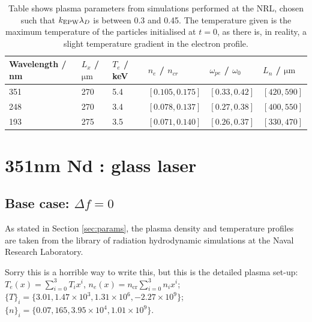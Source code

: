 \begin{table}[h]
\begin{center}

\begin{tabular}{|l|l|l|l|l|l|}
\hline
Wavelength / nm & $L_x$ /$\si{\micro\metre}$ & $T_e$ / keV & $n_e$ / $n_{cr}$ & $\omega_{pe}$ / $\omega_0$ & $L_n$ / $\si{\micro\metre}$
\\ \hline 
351 & 270 & 5.4 & $[0.105,0.175]$ & $[0.33,0.42]$ & $[420,590]$ \\ \hline
248 & 270 & 3.4 & $[0.078,0.137]$ & $[0.27,0.38]$ & $[400,550]$ \\ \hline
193 & 275 & 3.5 & $[0.071,0.140]$ & $[0.26,0.37]$ & $[330,470]$ \\ \hline

\end{tabular}

\end{center}
\caption{Table shows plasma parameters from simulations performed at the NRL, chosen such that $k_\mathrm{EPW}\lambda_D$ is between 0.3 and 0.45. The temperature given is the maximum temperature of the particles initialised at $t=0$, as there is, in reality, a slight temperature gradient in the electron profile.}
\label{tab:plasma}
\end{table}




\section{351nm Nd : glass laser}\label{sec:351}

\subsection{Base case: $\Delta f=0$}
As stated in Section \ref{sec:params}, the plasma density and temperature profiles are taken from the library of radiation hydrodynamic simulations at the Naval Research Laboratory. 

Sorry this is a horrible way to write this, but this is the detailed plasma set-up: $T_e(x) = \sum^3_{i=0} T_i x^i$, $n_e(x) = n_{\mathrm{cr}}\sum^3_{i=0} n_i x^i $;
$\{T\}_i  = \{3.01, 1.47\times10^3,1.31\times10^6,-2.27\times10^9\}$;
$\{n\}_i  = \{0.07, 165, 3.95\times10^4, 1.01\times10^9\}$. 

